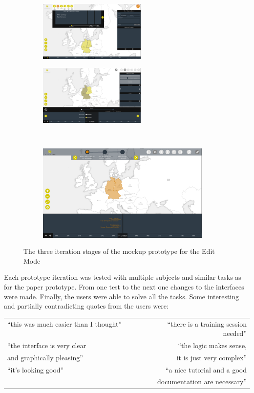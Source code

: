 \begin{figure}[H]
\centering
\begin{subfigure}[b]{.5\textwidth}
  \centering
  \includegraphics[width=200px]{graphics/development/design_process/mockup_prototype_1.png}
\end{subfigure}%
\begin{subfigure}[b]{.5\textwidth}
  \centering
  \includegraphics[width=200px]{graphics/development/design_process/mockup_prototype_2.png}
\end{subfigure} \\[0.8em]

\begin{subfigure}[b]{1.0\textwidth}
  \centering
  \includegraphics[width=325px]{graphics/development/design_process/mockup_prototype_3.png}
\end{subfigure}
\caption{The three iteration stages of the mockup prototype for the Edit Mode}
\label{fig:mockup_prototypes}
\end{figure}

Each prototype iteration was tested with multiple subjects and similar tasks as for the paper prototype. From one test to the next one changes to the interfaces were made. Finally, the users were able to solve all the tasks. Some interesting and partially contradicting quotes from the users were:
\begin{quoteit}
  \begin{tabular}{l r}
    ``this was much easier than I thought'' ~~~~~~~~ &
    ``there is a training session needed'' \\[0.75em]
    ``the interface is very clear &
    ``the logic makes sense, \\
    and graphically pleasing'' &
    it is just very complex'' \\[0.75em]
    ``it's looking good'' &
    ``a nice tutorial and a good \\
    & documentation are necessary'' \\
  \end{tabular}
\end{quoteit}


